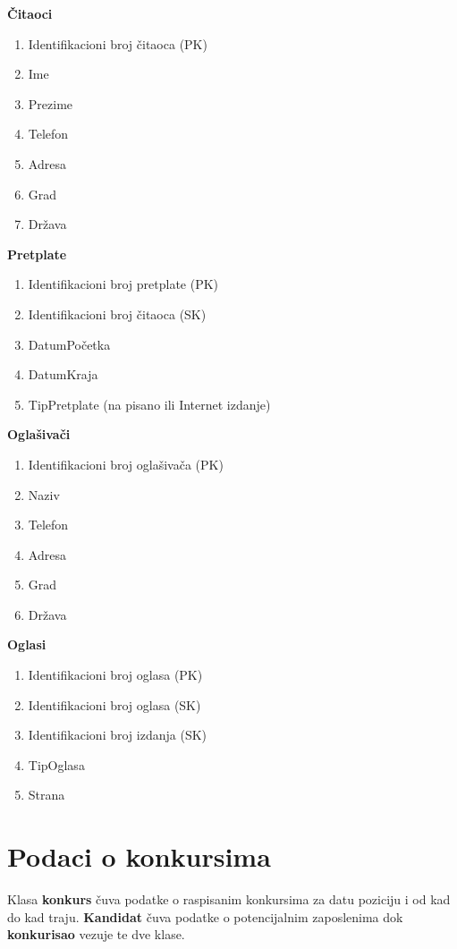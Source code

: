 \noindent \textbf{Čitaoci}
\begin{enumerate}
\item Identifikacioni broj čitaoca (PK)
\item Ime
\item Prezime
\item Telefon
\item Adresa
\item Grad
\item Država
\end{enumerate} \vspace{5mm}

\noindent \textbf{Pretplate}
\begin{enumerate}
\item Identifikacioni broj pretplate (PK)
\item Identifikacioni broj čitaoca (SK)
\item DatumPočetka
\item DatumKraja
\item TipPretplate (na pisano ili Internet izdanje)
\end{enumerate} \vspace{5mm}

\noindent \textbf{Oglašivači}
\begin{enumerate}
\item Identifikacioni broj oglašivača (PK)
\item Naziv
\item Telefon
\item Adresa
\item Grad
\item Država
\end{enumerate} \vspace{5mm}

\noindent \textbf{Oglasi}
\begin{enumerate}
\item Identifikacioni broj oglasa (PK)
\item Identifikacioni broj oglasa (SK)
\item Identifikacioni broj izdanja (SK)
\item TipOglasa
\item Strana
\end{enumerate}  \vspace{5mm}

\section{Podaci o konkursima}
Klasa \textbf{konkurs} čuva podatke o raspisanim konkursima za datu poziciju i od kad do kad traju. \textbf{Kandidat} čuva podatke o potencijalnim zaposlenima dok \textbf{konkurisao} vezuje te dve klase.

